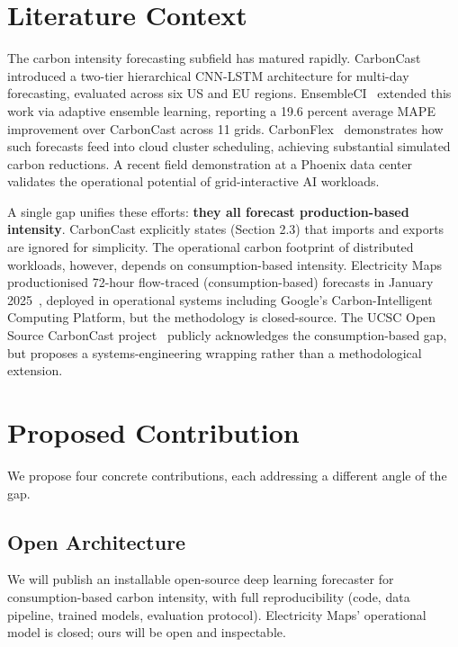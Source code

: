 \documentclass[sigconf,nonacm]{acmart}
\begin{document}
\section{Literature Context}

The carbon intensity forecasting subfield has matured rapidly. CarbonCast~\cite{maji2022carboncast} introduced a two-tier hierarchical CNN-LSTM architecture for multi-day forecasting, evaluated across six US and EU regions. EnsembleCI~\cite{yan2025ensembleci} extended this work via adaptive ensemble learning, reporting a 19.6 percent average MAPE improvement over CarbonCast across 11 grids. CarbonFlex~\cite{hanafy2025carbonflex} demonstrates how such forecasts feed into cloud cluster scheduling, achieving substantial simulated carbon reductions. A recent field demonstration at a Phoenix data center~\cite{colangelo2025phoenix} validates the operational potential of grid-interactive AI workloads.

A single gap unifies these efforts: \textbf{they all forecast production-based intensity}. CarbonCast explicitly states (Section 2.3) that imports and exports are ignored for simplicity. The operational carbon footprint of distributed workloads, however, depends on consumption-based intensity. Electricity Maps productionised 72-hour flow-traced (consumption-based) forecasts in January 2025~\cite{electricitymaps2025forecast}, deployed in operational systems including Google's Carbon-Intelligent Computing Platform, but the methodology is closed-source. The UCSC Open Source CarbonCast project~\cite{ucscospre2025} publicly acknowledges the consumption-based gap, but proposes a systems-engineering wrapping rather than a methodological extension.

\section{Proposed Contribution}

We propose four concrete contributions, each addressing a different angle of the gap.

\subsection{Open Architecture}
We will publish an installable open-source deep learning forecaster for consumption-based carbon intensity, with full reproducibility (code, data pipeline, trained models, evaluation protocol). Electricity Maps' operational model is closed; ours will be open and inspectable.
\end{document}
